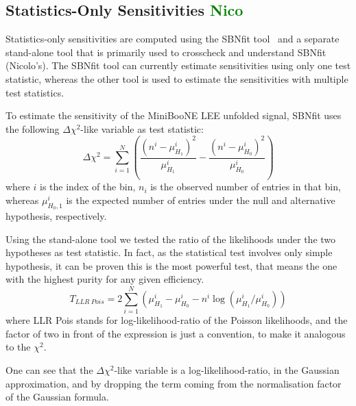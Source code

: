 \documentclass[a4paper]{article}
\begin{document}
\subsection{Statistics-Only Sensitivities \textcolor{green}{Nico}}
\label{subsec:teststats}

Statistics-only sensitivities are computed using the SBNfit tool~\cite{bib:sbnfit20437} and a separate stand-alone tool that is primarily used to crosscheck and understand SBNfit (Nicolo's).
The SBNfit tool can currently estimate sensitivities using only one test statistic, whereas the other tool is used to estimate the sensitivities with multiple test statistics.

To estimate the sensitivity of the MiniBooNE LEE unfolded signal, SBNfit uses the following $\Delta \chi^2$-like variable as test statistic:
\begin{equation}
\label{eqn:deltachi2}
\Delta\chi^2 = \sum_{i=1}^{N}\left( \frac{(n^i - \mu^i_{H_1})^2}{\mu^i_{H_1}} - \frac{(n^i - \mu^i_{H_0})^2}{\mu^i_{H_0}} \right)
\end{equation}
where $i$ is the index of the bin, $n_i$ is the observed number of entries in that bin, whereas $\mu^i_{H_0, 1}$ is the expected number of entries under the null and alternative hypothesis, respectively.

Using the stand-alone tool we tested the ratio of the likelihoods under the two hypotheses as test statistic.
In fact, as the statistical test involves only simple hypothesis, it can be proven this is the most powerful test, that means the one with the highest purity for any given efficiency.
\begin{equation}
\label{eqn:llrpois}
T_{LLR~Pois} = 2 \sum_{i=1}^{N}\left( \mu^i_{H_1} - \mu^i_{H_0} - n^i\log\left(\mu^i_{H_1} / \mu^i_{H_0}\right) \right)
\end{equation}
where LLR Pois stands for log-likelihood-ratio of the Poisson likelihoods, and the factor of two in front of the expression is just a convention, to make it analogous to the $\chi^2$.

One can see that the $\Delta \chi^2$-like variable is a log-likelihood-ratio, in the Gaussian approximation, and by dropping the term coming from the normalisation factor of the Gaussian formula.
\end{document}
